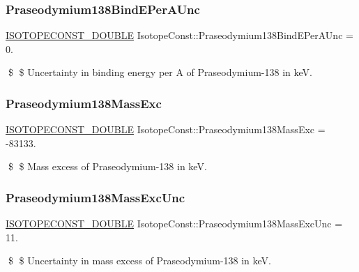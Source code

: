 \subsubsection{\texorpdfstring{Praseodymium138\+Bind\+E\+Per\+A\+Unc}{Praseodymium138BindEPerAUnc}}
{\footnotesize\ttfamily \mbox{\hyperlink{group___isotope_const-_macros_ga8f45a7272ce02c0b4c65c44636ed719a}{I\+S\+O\+T\+O\+P\+E\+C\+O\+N\+S\+T\+\_\+\+D\+O\+U\+B\+LE}} Isotope\+Const\+::\+Praseodymium138\+Bind\+E\+Per\+A\+Unc = 0.}

\$ \$ Uncertainty in binding energy per A of Praseodymium-\/138 in keV. \mbox{\label{group___isotope_const-_praseodymium-_pr138_ga414fde83bbfa79c16220b785c8591dc5}} 
\subsubsection{\texorpdfstring{Praseodymium138\+Mass\+Exc}{Praseodymium138MassExc}}
{\footnotesize\ttfamily \mbox{\hyperlink{group___isotope_const-_macros_ga8f45a7272ce02c0b4c65c44636ed719a}{I\+S\+O\+T\+O\+P\+E\+C\+O\+N\+S\+T\+\_\+\+D\+O\+U\+B\+LE}} Isotope\+Const\+::\+Praseodymium138\+Mass\+Exc = -\/83133.}

\$ \$ Mass excess of Praseodymium-\/138 in keV. \mbox{\label{group___isotope_const-_praseodymium-_pr138_ga2bfcc0ba1a1fc9f233cbfff511e519c2}} 
\subsubsection{\texorpdfstring{Praseodymium138\+Mass\+Exc\+Unc}{Praseodymium138MassExcUnc}}
{\footnotesize\ttfamily \mbox{\hyperlink{group___isotope_const-_macros_ga8f45a7272ce02c0b4c65c44636ed719a}{I\+S\+O\+T\+O\+P\+E\+C\+O\+N\+S\+T\+\_\+\+D\+O\+U\+B\+LE}} Isotope\+Const\+::\+Praseodymium138\+Mass\+Exc\+Unc = 11.}

\$ \$ Uncertainty in mass excess of Praseodymium-\/138 in keV. \mbox{\label{group___isotope_const-_praseodymium-_pr138_ga8b9ffe79e1792889d781f4a1c6571940}} 
